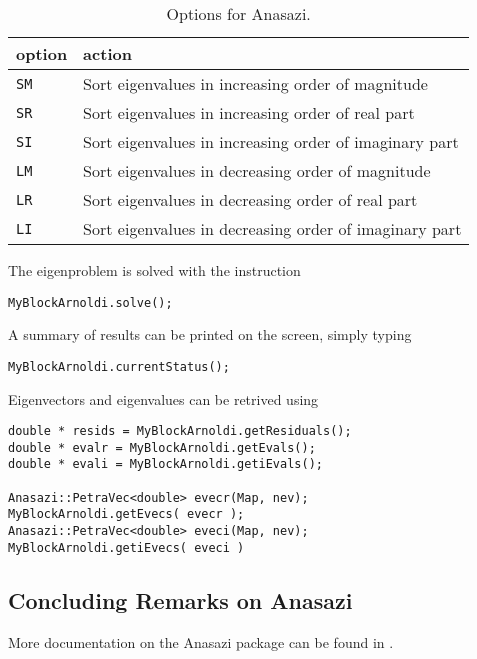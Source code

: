 \begin{table}
\begin{center}
\begin{tabular}{| p{2cm} l |}
\hline
option & action \\
\hline

{\tt SM} & Sort eigenvalues in increasing order of magnitude \\

{\tt SR} & Sort eigenvalues in increasing order of real part \\

{\tt SI} & Sort eigenvalues in increasing order of imaginary part \\

{\tt LM} & Sort eigenvalues in decreasing order of magnitude \\

{\tt LR} & Sort eigenvalues in decreasing order of real part \\

{\tt LI} & Sort eigenvalues in decreasing order of imaginary part \\
\hline
\end{tabular}
\caption{Options for Anasazi.}
\label{tab:anasazi}
\end{center}
\end{table}


The eigenproblem is solved with the instruction
\begin{verbatim}
MyBlockArnoldi.solve();
\end{verbatim}
A summary of results can be printed on the screen, simply typing
\begin{verbatim}
MyBlockArnoldi.currentStatus();
\end{verbatim}
Eigenvectors and eigenvalues can be retrived using
\begin{verbatim}
double * resids = MyBlockArnoldi.getResiduals();
double * evalr = MyBlockArnoldi.getEvals(); 
double * evali = MyBlockArnoldi.getiEvals();

Anasazi::PetraVec<double> evecr(Map, nev);
MyBlockArnoldi.getEvecs( evecr );
Anasazi::PetraVec<double> eveci(Map, nev);
MyBlockArnoldi.getiEvecs( eveci )
\end{verbatim}





\subsection{Concluding Remarks on Anasazi}
\label{sec:anasazi_concluding}

More documentation on the Anasazi package can be found in
\cite{Anasazi-Ref-Guide,Anasazi-User-Guide}.

